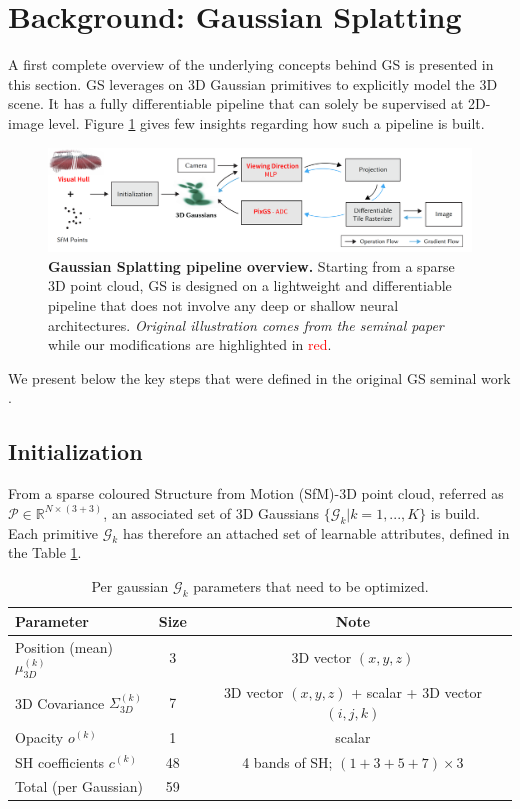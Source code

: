 \section{Background: Gaussian Splatting}
A first complete overview of the underlying concepts behind GS is presented in this section. GS leverages on 3D Gaussian primitives to explicitly model the 3D scene. It has a fully differentiable pipeline that can solely be supervised at 2D-image level. Figure \ref{fig:gs-overview} gives few insights regarding how such a pipeline is built. \newline

\begin{figure}[htb!]
    \center
  \includegraphics[width=\linewidth]{images/gaussiansplatting/overview_pipeline.png}
  \caption{\textbf{Gaussian Splatting pipeline overview.} Starting from a sparse 3D point cloud, GS is designed on a lightweight and differentiable pipeline that does not involve any deep or shallow neural architectures. \textit{Original illustration comes from the seminal paper}\citep{kerbl20233d} while our modifications are highlighted in \textcolor{red}{red}.}
  \label{fig:gs-overview}
\end{figure}

We present below the key steps that were defined in the original GS seminal work \citep{kerbl20233d}.


\subsection{Initialization} From a sparse coloured Structure from Motion (SfM)-3D point cloud, referred as $\mathcal{P}\in\mathbb{R}^{N\times(3+3)}$, an associated set of 3D Gaussians $\{\mathcal{G}_{k}|k=1,...,K\}$ is build. Each primitive $\mathcal{G}_{k} $ has therefore an attached set of learnable attributes, defined in the Table \ref{tab:gauss-param}. 


\begin{table}[h!]
  \centering
   \caption{Per gaussian $\mathcal{G}_{k} $  parameters that need to be optimized.}
  \begin{tabular}{lcc}
  \hline
  Parameter  & Size & Note \\
  \hline
  Position (mean)  $\mu^{(k)}_{3D}$ & 3 & 3D vector $(x, y, z)$ \\
  3D Covariance $\Sigma^{(k)}_{3D}$ & 7 & 3D vector $(x, y, z)$ + scalar + 3D vector  $(i, j, k)$\\
  Opacity  $o^{(k)}$ & 1 & scalar \\
  SH coefficients  $c^{(k)}$ & 48 & 4 bands of SH; $(1+3+5+7)\times3$ \\
  \hline
  Total (per Gaussian)  & 59 & \\
  \hline
  \end{tabular}
 
  \label{tab:gauss-param}
\end{table}

